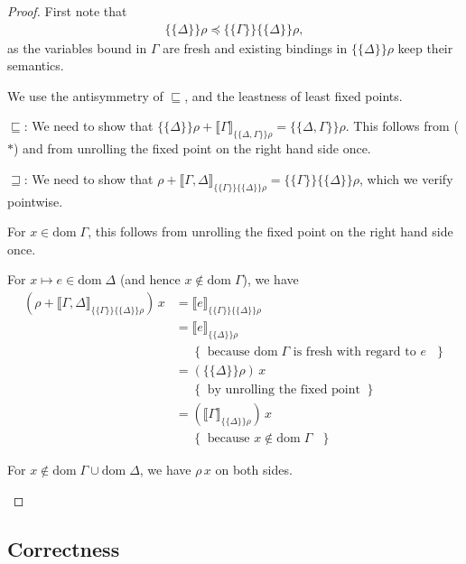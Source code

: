 \documentclass{jfp1}
\theoremstyle{nonumberbreak}
\newtheorem{proof}{Proof}
\newcommand{\dom}[1]{\text{dom}\;#1}
\newcommand{\dsem}[2]{\llbracket #1 \rrbracket_{#2}}
\newcommand{\esem}[1]{\{\!\!\!\{#1\}\!\!\!\}}
\newcommand{\aexpl}[1]{&\mathrel{\phantom{=}}\left\{\text{ #1 }\right\}}
\begin{document}
\begin{proof}
First note that 
\begin{align*}
\esem{\Delta}\rho \preceq \esem{\Gamma}{\esem{\Delta}\rho}, \tag{$\ast$}
\end{align*}
as the variables bound in $\Gamma$ are fresh and existing bindings in $\esem{\Delta}\rho$ keep their semantics.

We use the antisymmetry of $\sqsubseteq$, and the leastness of least fixed points.
\begin{compactitem}[$\sqsubseteq$:]
\item[$\sqsubseteq$:] We need to show that $\esem{\Delta}\rho + \dsem\Gamma{\esem{\Delta,\Gamma}\rho} = \esem{\Delta,\Gamma}\rho$. This follows from ($\ast$) and from unrolling the fixed point on the right hand side once.
\item[$\sqsupseteq$:] We need to show that $\rho + \dsem{\Gamma, \Delta}{\esem{\Gamma}{\esem{\Delta}\rho}} = \esem{\Gamma}{\esem{\Delta}\rho}$, which we verify pointwise.
\begin{compactitem}
\item For $x\in \dom\Gamma$, this follows from unrolling the fixed point on the right hand side once.
\item For $x\mapsto e \in \dom\Delta$ (and hence $x\notin \dom \Gamma$), we have
\begin{align*}
(\rho + \dsem{\Gamma, \Delta}{\esem{\Gamma}{\esem{\Delta}\rho}})\, x 
&= \dsem{e}{\esem{\Gamma}{\esem{\Delta}\rho}} \\
&= \dsem{e}{\esem{\Delta}\rho} \\
\aexpl{because $\dom\Gamma$ is fresh with regard to $e$} \\
&= (\esem\Delta\rho)\, x\\
\aexpl{by unrolling the fixed point} \\
&= (\dsem{\Gamma}{\esem\Delta\rho})\, x\\
\aexpl{because $x\notin \dom\Gamma$}
\end{align*}
\item For $x\notin \dom \Gamma \cup \dom \Delta$, we have $\rho\, x$ on both sides.
\end{compactitem}
\end{compactitem}
\end{proof}

\subsection{Correctness}
\end{document}
